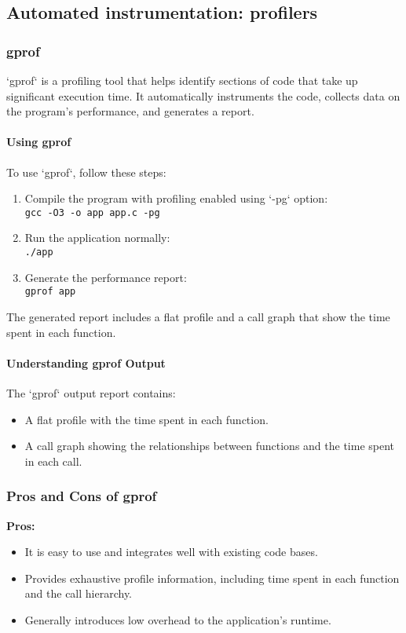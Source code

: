 \documentclass[12pt]{article}
\begin{document}
\subsection{Automated instrumentation: profilers}

\subsubsection{gprof}
`gprof` is a profiling tool that helps identify sections of code that take up significant execution time. It automatically instruments the code, collects data on the program's performance, and generates a report.

\paragraph{Using gprof}
To use `gprof`, follow these steps:
\begin{enumerate}
    \item Compile the program with profiling enabled using `-pg` option:\\
    \texttt{gcc -O3 -o app app.c -pg}
    \item Run the application normally:\\
    \texttt{./app}
    \item Generate the performance report:\\
    \texttt{gprof app}
\end{enumerate}

The generated report includes a flat profile and a call graph that show the time spent in each function.

\paragraph{Understanding gprof Output}
The `gprof` output report contains:
\begin{itemize}
    \item A flat profile with the time spent in each function.
    \item A call graph showing the relationships between functions and the time spent in each call.
\end{itemize}

\subsubsection{Pros and Cons of gprof}
\textbf{Pros:}
\begin{itemize}
    \item It is easy to use and integrates well with existing code bases.
    \item Provides exhaustive profile information, including time spent in each function and the call hierarchy.
    \item Generally introduces low overhead to the application's runtime.
\end{itemize}
\end{document}
